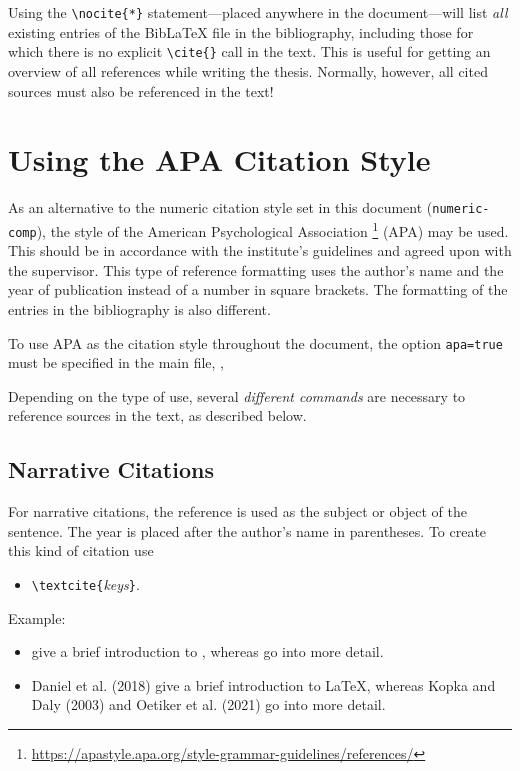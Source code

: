 Using the \verb!\nocite{*}! statement---placed anywhere in the document---will
list \emph{all} existing entries of the BibLaTeX file in the bibliography,
including those for which there is no explicit \verb!\cite{}! call in the text.
This is useful for getting an overview of all references while writing the thesis.
Normally, however, all cited sources must also be referenced in the text!


\section{Using the APA Citation Style}
\label{sec:APA}

As an alternative to the numeric citation style set in this document
(\texttt{numeric-comp}), the style of the American Psychological Association%
\footnote{\url{https://apastyle.apa.org/style-grammar-guidelines/references/}}
(APA) may be used. This should be in accordance with the institute's guidelines
and agreed upon with the supervisor. This type of reference formatting uses the
author's name and the year of publication instead of a number in square
brackets. The formatting of the entries in the bibliography is also different.

To use APA as the citation style throughout the document, the option
\texttt{apa=true} must be specified in the main file, \eg,
%
%
Depending on the type of use, several \emph{different commands} are necessary
to reference sources in the text, as described below.

\subsection{Narrative Citations}

For narrative citations, the reference is used as the subject or object of the
sentence. The year is placed after the author's name in parentheses. To create
this kind of citation use 
%
\begin{itemize}
    \item[] \verb!\textcite{!\textit{keys}\verb!}!.
\end{itemize}
%
Example:
%
\begin{itemize}
\item[]
\begin{LaTeXCode}[numbers=none,breakindent=0pt]
\textcite{Daniel2018} give a brief introduction to \latex, whereas
\textcite{Oetiker2021, Kopka2003} go into more detail.
\end{LaTeXCode}
\item[]
    Daniel et al. (2018) give a brief introduction to LaTeX, whereas Kopka and
    Daly (2003) and Oetiker et al. (2021) go into more detail.
\end{itemize}


